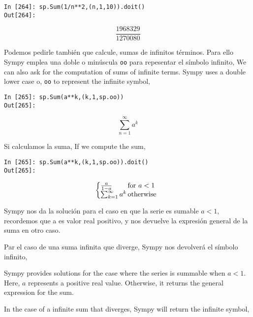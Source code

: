 \begin{center}
	\begin{minipage}{.5\textwidth}
		\begin{verbatim}
In [264]: sp.Sum(1/n**2,(n,1,10)).doit()
Out[264]: 	
		\end{verbatim}
		\begin{equation*}
			\frac{1968329}{1270080}
		\end{equation*}
	\end{minipage}
\end{center}
\begin{paracol}{2}
Podemos pedirle también que calcule, sumas de infinitos términos. Para ello Sympy emplea una doble o minúscula \texttt{oo} para repesentar el símbolo infinito,
\switchcolumn
We can also ask for the computation of sums of infinite terms. Sympy uses a double lower case o, \texttt{oo} to represent the infinite symbol,
\end{paracol}
\begin{center}
	\begin{minipage}{.8\textwidth}
		\begin{verbatim}
In [265]: sp.Sum(a**k,(k,1,sp.oo))
Out[265]: 	
		\end{verbatim}
		\begin{equation*}
		\sum_{n=1}^{\infty}a^k	
		\end{equation*}
	\end{minipage}
\end{center}
\begin{paracol}{2}
Si calculamos la suma,
\switchcolumn
If we compute the sum,
\end{paracol}
\begin{center}
	\begin{minipage}{.6\textwidth}
		\begin{verbatim}
In [265]: sp.Sum(a**k,(k,1,sp.oo)).doit()
Out[265]: 	
		\end{verbatim}
		\begin{equation*}
		\left\{
		\begin{array}{@{}l@{\,}l}
			\frac{a}{1-a} & \text{for}\ a<1 \\
			\sum_{k=1}^{\infty} a^k & \text{otherwise}
		\end{array}
		\right.
	\end{equation*}
	\end{minipage}
\end{center}

\begin{paracol}{2}
Sympy nos da la solución para el caso en que la serie es sumable $a<1$, recordemos que a es valor real positivo, y nos devuelve la expresión general de la suma en otro caso.

Par el caso de una suma infinita que diverge, Sympy nos devolverá el símbolo infinito,

\switchcolumn
Sympy provides solutions for the case where the series is summable when \( a < 1 \). Here, \( a \) represents a positive real value. Otherwise, it returns the general expression for the sum.

In the case of a infinite sum that diverges, Sympy will return the infinite symbol,
\end{paracol}


